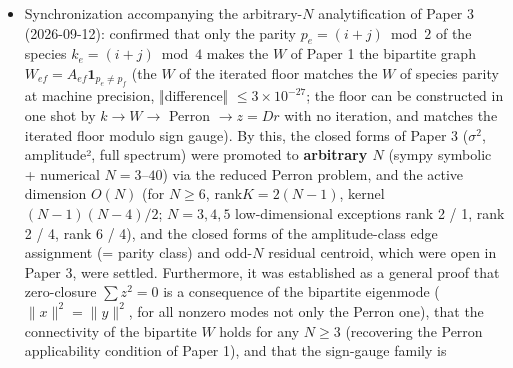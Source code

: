 \documentclass[
  a4paper,
]{ltjsarticle}
\begin{document}
\begin{itemize}
  mechanism = time-varying non-normal product (the slope of the
  time-varying product matches the measurement and exceeds the floor
  freeze by 18--31\%, asserted, Paper 6), (B) the terminal block
  decomposition does not stand for the data series (make\_parent floor →
  terminus) and the minimal block is intrinsic to the cyclic-Fourier /
  integer-K high-symmetry floor (rejected, Paper 9), (C) \(\sigma=N-1\)
  ↔ vertex sector does not correspond, being a coincidence of dimension
  labels (the 3-decomposition and \(\sigma\to N-1\) retained, rejected,
  Paper 8). Each reproduction was saved in a dedicated package (py +
  results + README + REPORT + SHA + run\_all) and cited in the relevant
  paper. Those left genuinely open (\(V(r)\) first principles, the
  closed form of the onset/amplification rate, coordinates/gauge/clock,
  the amplitude-preserving control dynamics for circular derivation) are
  explicitly noted as future work. The \(N\ge18\) long-time run of the
  theoretical floor was judged unnecessary as it is trivial from the
  \(N=64\) confirmation of the data floor.
\item
  Synchronization accompanying the arbitrary-\(N\) analytification of
  Paper 3 (2026-09-12): confirmed that only the parity
  \(p_e=(i+j)\bmod2\) of the species \(k_e=(i+j)\bmod4\) makes the \(W\)
  of Paper 1 the bipartite graph
  \(W_{ef}=A_{ef}\mathbf 1_{p_e\neq p_f}\) (the \(W\) of the iterated
  floor matches the \(W\) of species parity at machine precision,
  ‖difference‖ \(\le3\times10^{-27}\); the floor can be constructed in
  one shot by \(k\to W\to\) Perron \(\to z=Dr\) with no iteration, and
  matches the iterated floor modulo sign gauge). By this, the closed
  forms of Paper 3 (\(\sigma^2\), amplitude², full spectrum) were
  promoted to \textbf{arbitrary \(N\)} (sympy symbolic + numerical
  \(N=3\)--\(40\)) via the reduced Perron problem, and the active
  dimension \(O(N)\) (for \(N\ge6\), rank\(K=2(N-1)\), kernel
  \((N-1)(N-4)/2\); \(N=3,4,5\) low-dimensional exceptions rank 2 / 1,
  rank 2 / 4, rank 6 / 4), and the closed forms of the amplitude-class
  edge assignment (= parity class) and odd-\(N\) residual centroid,
  which were open in Paper 3, were settled. Furthermore, it was
  established as a general proof that zero-closure \(\sum z^2=0\) is a
  consequence of the bipartite eigenmode (\(\|x\|^2=\|y\|^2\), for all
  nonzero modes not only the Perron one), that the connectivity of the
  bipartite \(W\) holds for any \(N\ge3\) (recovering the Perron
  applicability condition of Paper 1), and that the sign-gauge family is

\end{itemize}
\end{document}
